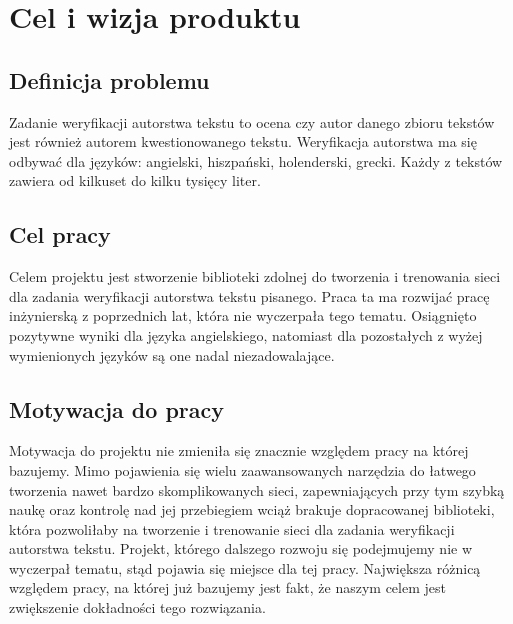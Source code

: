 \newpage
\section{Cel i wizja produktu}


\subsection{Definicja problemu}
Zadanie weryfikacji autorstwa tekstu to ocena czy autor danego zbioru tekstów jest również 
autorem kwestionowanego tekstu. Weryfikacja autorstwa ma się odbywać dla języków: angielski, 
hiszpański, holenderski, grecki. Każdy z tekstów zawiera od kilkuset do kilku tysięcy liter.
 
\subsection{Cel pracy}
Celem projektu jest stworzenie biblioteki zdolnej do tworzenia i trenowania sieci dla zadania 
weryfikacji autorstwa tekstu pisanego. Praca ta ma rozwijać pracę inżynierską z poprzednich lat, 
która nie wyczerpała tego tematu. Osiągnięto pozytywne wyniki dla języka angielskiego, natomiast 
dla pozostałych z wyżej wymienionych języków są one nadal niezadowalające.


\subsection{Motywacja do pracy}
Motywacja do projektu nie zmieniła się znacznie względem pracy na której bazujemy. Mimo pojawienia 
się wielu zaawansowanych narzędzia do łatwego tworzenia nawet bardzo skomplikowanych sieci, 
zapewniających przy tym szybką naukę oraz kontrolę nad jej przebiegiem wciąż brakuje dopracowanej 
biblioteki, która pozwoliłaby na tworzenie i trenowanie sieci dla zadania weryfikacji autorstwa 
tekstu. Projekt, którego dalszego rozwoju się podejmujemy nie w wyczerpał tematu, stąd pojawia się 
miejsce dla tej pracy. Największa różnicą względem pracy, na której już bazujemy jest fakt, że 
naszym celem jest zwiększenie dokładności tego rozwiązania.

